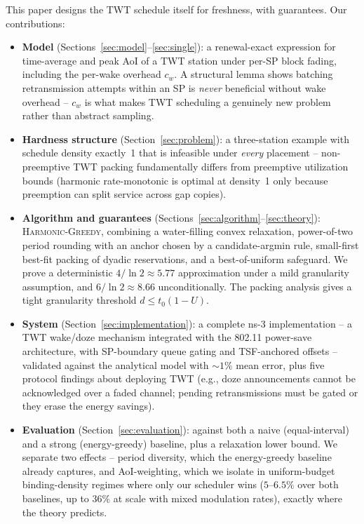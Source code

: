 This paper designs the TWT schedule itself for freshness, with guarantees.
Our contributions:
\begin{itemize}
\item \textbf{Model} (Sections~\ref{sec:model}--\ref{sec:single}): a
renewal-exact expression for time-average and peak AoI of a TWT station under
per-SP block fading, including the per-wake overhead $c_w$. A structural
lemma shows batching retransmission attempts within an SP is \emph{never}
beneficial without wake overhead -- $c_w$ is what makes TWT scheduling a
genuinely new problem rather than abstract sampling.
\item \textbf{Hardness structure} (Section~\ref{sec:problem}): a three-station
example with schedule density exactly~1 that is infeasible under \emph{every}
placement -- non-preemptive TWT packing fundamentally differs from preemptive
utilization bounds (harmonic rate-monotonic is optimal at density~1 only
because preemption can split service across gap copies).
\item \textbf{Algorithm and guarantees}
(Sections~\ref{sec:algorithm}--\ref{sec:theory}): \textsc{Harmonic-Greedy},
combining a water-filling convex relaxation, power-of-two period rounding
with an anchor chosen by a candidate-argmin rule, small-first best-fit
packing of dyadic reservations, and a best-of-uniform safeguard. We prove a
deterministic $4/\ln 2 \approx 5.77$ approximation under a mild granularity
assumption, and $6/\ln 2 \approx 8.66$ unconditionally. The packing analysis
gives a tight granularity threshold $d \le t_0 (1-U)$.
\item \textbf{System} (Section~\ref{sec:implementation}): a complete ns-3
implementation -- a TWT wake/doze mechanism integrated with the 802.11
power-save architecture, with SP-boundary queue gating and TSF-anchored
offsets -- validated against the analytical model with ${\sim}1\%$ mean
error, plus five
protocol findings about deploying TWT (e.g., doze announcements cannot be
acknowledged over a faded channel; pending retransmissions must be gated or
they erase the energy savings).
\item \textbf{Evaluation} (Section~\ref{sec:evaluation}): against both a
naive (equal-interval) and a strong (energy-greedy) baseline, plus a
relaxation lower bound. We separate two effects -- period diversity, which
the energy-greedy baseline already captures, and AoI-weighting, which we
isolate in uniform-budget binding-density regimes where only our scheduler
wins ($5$--$6.5\%$ over both baselines, up to $36\%$ at scale with mixed
modulation rates), exactly where the theory predicts.
\end{itemize}

